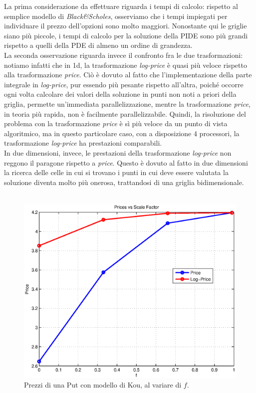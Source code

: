\documentclass[a4paper,10pt]{report}
\theoremstyle{plain}
\theoremstyle{definition}
\theoremstyle{remark}
\begin{document}
La prima considerazione da effettuare riguarda i tempi di calcolo: rispetto al semplice modello di \emph{Black\&Scholes}, osserviamo che i tempi impiegati per individuare il prezzo dell'opzioni sono molto maggiori. Nonostante qui le griglie siano pi\`u piccole, i tempi di calcolo per la soluzione della PIDE sono pi\`u grandi rispetto a quelli della PDE di almeno un ordine di grandezza.\\La seconda osservazione riguarda invece il confronto fra le due trasformazioni: notiamo infatti che in 1d, la trasformazione \emph{log-price} \`e quasi pi\`u veloce rispetto alla trasformazione \emph{price}. Ci\`o \`e dovuto al fatto che l'implementazione della parte integrale in \emph{log-price}, pur essendo pi\`u pesante rispetto all'altra, poich\'e occorre ogni volta calcolare dei valori della soluzione in punti non noti a priori della griglia, permette un'immediata parallelizzazione, mentre la trasformazione \emph{price}, in teoria pi\`u rapida, non \`e facilmente parallelizzabile. Quindi, la risoluzione del problema con la trasformazione \emph{price} \`e s\`i pi\`u veloce da un punto di vista algoritmico, ma in questo particolare caso, con a disposizione 4 processori, la trasformazione \emph{log-price} ha prestazioni comparabili.\\In due dimensioni, invece, le prestazioni della trasformazione \emph{log-price} non reggono il paragone rispetto a \emph{price}. Questo è dovuto al fatto in due dimensioni la ricerca delle celle in cui si trovano i punti in cui deve essere valutata la soluzione diventa molto più onerosa, trattandosi di una griglia bidimensionale.\\\\
\begin{figure}[htp!]
\begin{center}
\includegraphics[width=12cm]{img/test2-scalefactor.eps}
\caption{Prezzi di una Put con modello di Kou, al variare di $f$.}
\label{fig:test2-scalefactor}
\end{center}
\end{figure}
\end{document}
